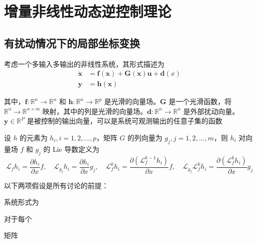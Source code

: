 \section{增量非线性动态逆控制理论}

\subsection{有扰动情况下的局部坐标变换}
考虑一个多输入多输出的非线性系统，其形式描述为
\begin{equation}
  \begin{aligned}
    \dot{\boldsymbol{x}}&=\boldsymbol{f}(\boldsymbol{x})+\boldsymbol{G}(\boldsymbol{x})\boldsymbol{u} + \boldsymbol{d}(x)\\
    \boldsymbol{y}&=\boldsymbol{h}(\boldsymbol{x})
  \end{aligned}
  \label{system}
\end{equation}

其中，$\boldsymbol{f}: \mathbb{R}^{n}\to\mathbb{R}^{n}$ 和 $\boldsymbol{h}: \mathbb{R}^{n}\to\mathbb{R}^{p}$ 是光滑的向量场。$\boldsymbol{G}$ 是一个光滑函数，将 $\mathbb{R}^{n}\to\mathbb{R}^{n\times m}$ 映射，其中的列是光滑的向量场。$\boldsymbol{d}: \mathbb{R}^{n}\to\mathbb{R}^{n}$ 是外部扰动向量。$\boldsymbol{y}\in\mathbb{R}^{P}$ 是被控制的输出向量，可以是系统可观测输出的任意子集的函数

设 $h$ 的元素为 $h_i, i = 1, 2, ..., p$，矩阵 $G$ 的列向量为 $g_j, j = 1, 2, ..., m$，则 $h_i$ 对向量场 $f$ 和 $g_j$ 的 Lie 导数定义为
\begin{equation}
  \mathcal{L}_{f}h_{i}=\frac{\partial h_{i}}{\partial x}f,\quad\mathcal{L}_{g_{j}}h_{i}=\frac{\partial h_{i}}{\partial x}g_{j},\quad\mathcal{L}_{f}^{k}h_{i}=\frac{\partial(\mathcal{L}_{f}^{k-1}h_{i})}{\partial x}f,\quad\mathcal{L}_{g_{j}}\mathcal{L}_{f}^{k}h_{i}=\frac{\partial(\mathcal{L}_{f}^{k}h_{i})}{\partial x}g_{j}
\end{equation}

以下两项假设是所有讨论的前提：

\begin{assumption}\label{assumption1}
  系统形式为

\end{assumption}
 
\begin{assumption}\label{assumption2}
  对于每个 
\end{assumption}

\begin{remark}
  矩阵
\end{remark}

